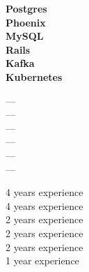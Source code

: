 \documentclass[9pt]{developercv} %
\begin{document}
\begin{minipage}[t]{0.45\textwidth} %
	\vspace{-\baselineskip} %

	\begin{minipage}[t]{0.3\textwidth}
		\large\textbf{Postgres}\\
		\large\textbf{Phoenix}\\
		\large\textbf{MySQL}\\
		\large\textbf{Rails}\\
		\large\textbf{Kafka}\\
		\large\textbf{Kubernetes}\\
	\end{minipage}
	\hfill
	\begin{minipage}[t]{0.05\textwidth}
		\large---\\
		---\\
		---\\
		---\\
		---\\
		---
	\end{minipage}
	\hfill
	\begin{minipage}[t]{0.6\textwidth}
		\large4 years experience\\
		4 years experience\\
		2 years experience\\
		2 years experience\\
		2 years experience\\
		1 year experience
	\end{minipage}
	
\end{minipage}
\hfill %
\end{document}
